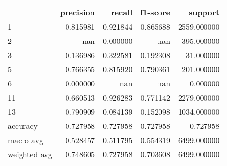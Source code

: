 \begin{tabular}{lrrrr}
\toprule
 & precision & recall & f1-score & support \\
\midrule
1 & 0.815981 & 0.921844 & 0.865688 & 2559.000000 \\
2 & nan & 0.000000 & nan & 395.000000 \\
3 & 0.136986 & 0.322581 & 0.192308 & 31.000000 \\
5 & 0.766355 & 0.815920 & 0.790361 & 201.000000 \\
6 & 0.000000 & nan & nan & 0.000000 \\
11 & 0.660513 & 0.926283 & 0.771142 & 2279.000000 \\
13 & 0.790909 & 0.084139 & 0.152098 & 1034.000000 \\
accuracy & 0.727958 & 0.727958 & 0.727958 & 0.727958 \\
macro avg & 0.528457 & 0.511795 & 0.554319 & 6499.000000 \\
weighted avg & 0.748605 & 0.727958 & 0.703608 & 6499.000000 \\
\bottomrule
\end{tabular}
